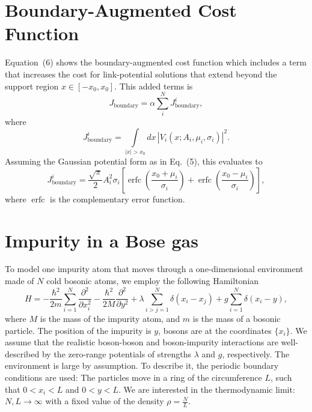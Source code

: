 \documentclass[reprint, twocolumn,amsmath,amssymb,showpacs,pra,superscriptaddress,aps]{revtex4-1}
\DeclareMathOperator\erfc{erfc}
\begin{document}
\onecolumngrid
\appendix

\section{Boundary-Augmented Cost Function}\label{app:J}
Equation~(6) shows the boundary-augmented cost function which includes a term that increases the cost for link-potential solutions that extend beyond the support region $x\in[-x_0,x_0]$. This added terms is
\begin{equation}
  J_{\mathrm{boundary}} = \alpha \sum_i^N J_{\mathrm{boundary}}^i,
\end{equation}
where 
\begin{equation}\label{eq:Jboundaryi}
  J_{\mathrm{boundary}}^i = \int\limits_{|x|>x_0}dx\,|V_i(x; A_i,\mu_i,\sigma_i)|^2.
\end{equation}
Assuming the Gaussian potential form as in Eq.~(5), this evaluates to
\begin{equation}\label{eq:JboundaryIGaussian}
  J_{\mathrm{boundary}}^i = \frac{\sqrt{\pi}}{2}A_i^2\sigma_i\left[
    \erfc\left(\frac{x_0+\mu_i}{\sigma_i}\right) +
    \erfc\left(\frac{x_0-\mu_i}{\sigma_i}\right)
  \right],
\end{equation}
where $\erfc$ is the complementary error function.


\section{Impurity in a Bose gas}\label{app:impurity_bose_gas}


To model one impurity atom that moves through a one-dimensional environment made of $N$ cold bosonic atoms, we employ the following Hamiltonian
\begin{equation}
H=-\frac{\hbar^2}{2m}\sum_{i=1}^N\frac{\partial^2}{\partial x_i^2}-\frac{\hbar^2}{2M}\frac{\partial^2}{\partial y^2}+\lambda \sum_{i>j=1}^N\delta(x_i-x_j)+g \sum_{i=1}^N \delta(x_i-y),
\end{equation}
where $M$ is the mass of the impurity atom, and $m$ is the mass of a bosonic particle. The position of the impurity is $y$, bosons are at the coordinates $\{x_i\}$. 
We assume that the realistic boson-boson and boson-impurity interactions are well-described by the zero-range potentials of strengths $\lambda$ and $g$, respectively. 
The environment is large by assumption. To describe it, the periodic boundary conditions are used: The particles move in a ring of the circumference $L$, such that $0<x_i<L$ and $0<y<L$.
We are interested in the thermodynamic limit: $N, L\to \infty$ with a fixed value of the density $\rho=\frac{N}{L}$.
\end{document}
